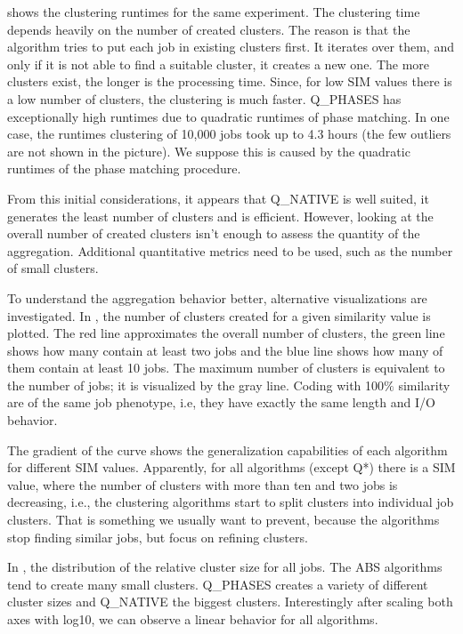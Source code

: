 \documentclass{jhps}
\begin{document}
 shows the clustering runtimes for the same experiment.
The clustering time depends heavily on the number of created clusters.
The reason is that the algorithm tries to put each job in existing clusters first.
It iterates over them, and only if it is not able to find a suitable cluster, it creates a new one.
The more clusters exist, the longer is the processing time.
Since, for low SIM values there is a low number of clusters, the clustering is much faster.
Q\_PHASES has exceptionally high runtimes due to quadratic runtimes of phase matching.
In one case, the runtimes clustering of 10,000 jobs took up to 4.3 hours (the few outliers are not shown in the picture).
We suppose this is caused by the quadratic runtimes of the phase matching procedure.

From this initial considerations, it appears that Q\_NATIVE is well suited, it generates the least number of clusters and is efficient.
However, looking at the overall number of created clusters isn't enough to assess the quantity of the aggregation.
Additional quantitative metrics need to be used, such as the number of small clusters.

\medskip

To understand the aggregation behavior better, alternative visualizations are investigated.
In , the number of clusters created for a given similarity value is plotted.
The red line approximates the overall number of clusters, the green line shows how many contain at least two jobs and the blue line shows how many of them contain at least 10 jobs.
The maximum number of clusters is equivalent to the number of jobs; it is visualized by the gray line.
Coding with 100$\%$  similarity are of the same job phenotype, i.e, they have exactly the same length and I/O behavior.

The gradient of the curve shows the generalization capabilities of each algorithm for different SIM values.
Apparently, for all algorithms (except Q*) there is a SIM value, where the number of clusters with more than ten and two jobs is decreasing, i.e., the clustering algorithms start to split clusters into individual job clusters.
That is something we usually want to prevent, because the algorithms stop finding similar jobs, but focus on refining clusters.

\smallskip

In , the distribution of the relative cluster size for all jobs.
The ABS algorithms tend to create many small clusters.
Q\_PHASES creates a variety of different cluster sizes and Q\_NATIVE the biggest clusters.
Interestingly after scaling both axes with log10, we can observe a linear behavior for all algorithms.
\end{document}
